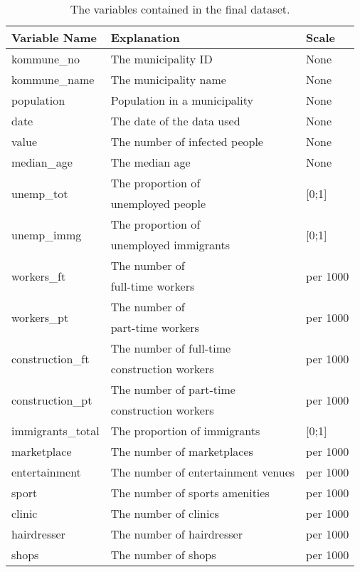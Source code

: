 \begin{table}[H] 
\caption{The variables contained in the final dataset.\label{datasetNorway}}
\begin{tabular}{l l l}
\toprule
\textbf{Variable Name}	& \textbf{Explanation}	& \textbf{Scale}\\
\midrule
kommune\_no & The municipality ID & None \\
kommune\_name & The municipality name & None \\
population & Population in a municipality & None \\
date & The date of the data used & None \\
value & The number of infected people & None \\
median\_age & The median age & None \\
\multirow{2}{*}{unemp\_tot} & The proportion of &\multirow{2}{*}{[0;1]}\\
& unemployed people \\
\multirow{2}{*}{unemp\_immg} & The proportion of & \multirow{2}{*}{[0;1]}\\
 & unemployed immigrants  \\
\multirow{2}{*}{workers\_ft} & The number of & \multirow{2}{*}{per 1000} \\
& full-time workers \\
\multirow{2}{*}{workers\_pt} & The number of & \multirow{2}{*}{per 1000} \\
& part-time workers \\
\multirow{2}{*}{construction\_ft} & The number of full-time & \multirow{2}{*}{per 1000} \\
& construction workers \\
\multirow{2}{*}{construction\_pt} & The number of part-time & \multirow{2}{*}{per 1000} \\
& construction workers \\
immigrants\_total & The proportion of immigrants  & [0;1] \\
marketplace & The number of marketplaces & per 1000 \\
entertainment & The number of entertainment venues & per 1000 \\
sport & The number of sports amenities & per 1000 \\
clinic & The number of clinics & per 1000 \\
hairdresser & The number of hairdresser & per 1000 \\
shops & The number of shops & per 1000 \\

\end{tabular}
\end{table}
